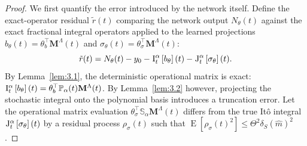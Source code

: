 \documentclass[11pt, a4paper]{article}
\theoremstyle{theoremstyle}
\theoremstyle{definitionstyle}
\DeclareMathOperator{\EE}{\mathrm E}
\begin{document}
\begin{proof}
    We first quantify the error introduced by the network itself. Define the exact-operator residual \(\tilde r(t)\) comparing the network output \(N_\theta(t)\) against the exact fractional integral operators applied to the learned projections \(b_\theta(t) = \theta_b^\top \mathbf M^\Lambda(t)\) and \(\sigma_\theta(t) = \theta_\sigma^\top \mathbf M^\Lambda(t)\):
    \begin{equation}
        \tilde r(t) = N_\theta(t) - y_0 - \II \left [ b_\theta \right ](t) - \JJ \left [ \sigma_\theta \right ](t).
    \end{equation}
    By Lemma~\ref{lem:3.1}, the deterministic operational matrix is exact: \( \II \left [ b_\theta \right ](t) = \theta^\top_b\mathbb P_\alpha(t)\mathbf M^\Lambda(t) \). By Lemma~\ref{lem:3.2} however, projecting the stochastic integral onto the polynomial basis introduces a truncation error. Let the operational matrix evaluation \(\theta_\sigma^\top \mathbb S_\alpha\mathbf M^\Lambda(t)\) differs from the true It\^o integral \(\JJ \left [ \sigma_\theta \right ](t)\) by a residual process \(\rho_\sigma(t)\) such that \(\EE[\rho_\sigma(t)^2] \leq \Theta^2\delta_S(\hat m)^2\).


\end{proof}
\end{document}
